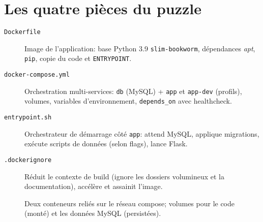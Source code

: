 \section{Les quatre pièces du puzzle}

\begin{description}
  \item[\texttt{Dockerfile}] Image de l'application: base Python 3.9 \texttt{slim-bookworm}, dépendances \textit{apt}, \texttt{pip}, copie du code et \texttt{ENTRYPOINT}.
  \item[\texttt{docker-compose.yml}] Orchestration multi-services: \texttt{db} (MySQL) + \texttt{app} et \texttt{app-dev} (profils), volumes, variables d'environnement, \texttt{depends\_on} avec healthcheck.
  \item[\texttt{entrypoint.sh}] Orchestrateur de démarrage côté \texttt{app}: attend MySQL, applique migrations, exécute scripts de données (selon flags), lance Flask.
  \item[\texttt{.dockerignore}] Réduit le contexte de build (ignore les dossiers volumineux et la documentation), accélère et assainit l'image.
\end{description}


\begin{figure}[H]
  \centering
  \caption[Architecture Docker (app+db)]{Deux conteneurs reliés sur le réseau compose; volumes pour le code (monté) et les données MySQL (persistées).}
\end{figure}

